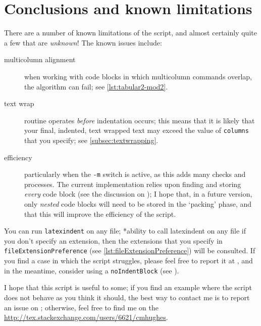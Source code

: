 \section{Conclusions and known limitations}\label{sec:knownlimitations}
 There are a number of known limitations of the script, and almost certainly quite a few
 that are \emph{unknown}! The known issues include:
 \begin{description}
  \item[multicolumn alignment] when working with code blocks in which multicolumn commands
   overlap, the algorithm can fail; see \vref{lst:tabular2-mod2}.
  \item[text wrap] routine operates \emph{before} indentation occurs; this means that it is
   likely that your final, indented, text wrapped text may exceed the value of
   \texttt{columns} that you specify; see \vref{subsec:textwrapping}.
  \item[efficiency] particularly when the \texttt{-m} switch is active, as this adds many checks
   and processes. The current implementation relies upon finding and storing \emph{every}
   code block (see the discussion on ); I hope that, in a future
   version, only \emph{nested} code blocks will need to be stored in the `packing' phase,
   and that this will improve the efficiency of the script.
 \end{description}

 You can run \texttt{latexindent} on any file; *{ability to call
 latexindent on any file} if you don't specify an extension, then the extensions that you
 specify in \lstinline[breaklines=true]!fileExtensionPreference! (see
 \vref{lst:fileExtensionPreference}) will be consulted. If you find a case in which the
 script struggles, please feel free to report it at \cite{latexindent-home}, and in the
 meantime, consider using a \texttt{noIndentBlock} (see ).%

 I hope that this script is useful to some; if you find an example where the script does
 not behave as you think it should, the best way to contact me is to report an issue on
 \cite{latexindent-home}; otherwise, feel free to find me on the
 \url{http://tex.stackexchange.com/users/6621/cmhughes}.
